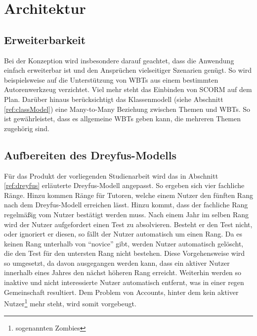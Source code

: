 \chapter{Architektur}

\section{Erweiterbarkeit}
Bei der Konzeption wird insbesondere darauf geachtet, dass die Anwendung einfach
erweiterbar ist und den Ansprüchen vielseitiger Szenarien genügt.
So wird beispielsweise auf die Unterstützung von WBTs aus einem bestimmten
Autorenwerkzeug verzichtet. Viel mehr steht das Einbinden von SCORM auf dem
Plan. Darüber hinaus berücksichtigt das Klassenmodell (siehe Abschnitt
\ref{ref:classModel}) eine Many-to-Many Beziehung zwischen Themen und WBTs. So
ist gewährleistet, dass es allgemeine WBTs geben kann, die mehreren Themen
zugehörig sind.

\section{Aufbereiten des Dreyfus-Modells}\label{ref:dreyfusConcept} 
Für das Produkt der vorliegenden Studienarbeit wird das in Abschnitt
\ref{ref:dreyfus} erläuterte Dreyfus-Modell angepasst. So ergeben sich vier
fachliche Ränge. Hinzu kommen Ränge für Tutoren, welche einem Nutzer den fünften
Rang nach dem Dreyfus-Modell erreichen lässt. Hinzu kommt, dass der fachliche
Rang regelmäßig vom Nutzer bestätigt werden muss. Nach einem Jahr im selben Rang
wird der Nutzer aufgefordert einen Test zu absolvieren.
Besteht er den Test nicht, oder ignoriert er diesen, so fällt der Nutzer
automatisch um einen Rang. Da es keinen Rang unterhalb von "`novice"' gibt,
werden Nutzer automatisch gelöscht, die den Test für den untersten Rang nicht
bestehen. Diese Vorgehensweise wird so umgesetzt, da davon ausgegangen werden
kann, dass ein aktiver Nutzer innerhalb eines Jahres den nächst höheren Rang
erreicht. Weiterhin werden so inaktive und nicht interessierte Nutzer
automatisch entfernt, was in einer regen Gemeinschaft resultiert. Dem Problem
von Accounts, hinter dem kein aktiver Nutzer\footnote{sogenannten Zombies} mehr
steht, wird somit vorgebeugt.

